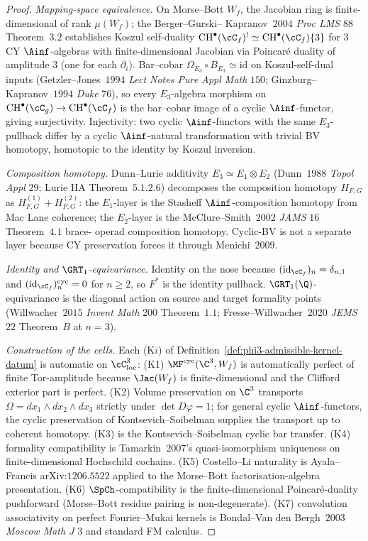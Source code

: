 \begin{proof}
\emph{Mapping-space equivalence.} On Morse--Bott $W_f$, the Jacobian
ring is finite-dimensional of rank $\mu(W_f)$; the Berger--Gurski--
Kapranov~$2004$ \textit{Proc LMS} $88$ Theorem~$3.2$ establishes
Koszul self-duality $\mathrm{CH}^\bullet(\cC_f)^! \simeq
\mathrm{CH}^\bullet(\cC_f)\{3\}$ for $3$CY $\Ainf$-algebras with
finite-dimensional Jacobian via Poincar\'e duality of amplitude $3$
(one for each $\partial_i$). Bar--cobar
$\Omega_{E_3} \circ B_{E_3} \simeq \mathrm{id}$ on Koszul-self-dual
inputs (Getzler--Jones~$1994$ \textit{Lect Notes Pure Appl Math} $150$;
Ginzburg--Kapranov~$1994$ \textit{Duke} $76$), so every $E_3$-algebra
morphism on $\mathrm{CH}^\bullet(\cC_g) \to \mathrm{CH}^\bullet(\cC_f)$
is the bar--cobar image of a cyclic $\Ainf$-functor, giving
surjectivity. Injectivity: two cyclic $\Ainf$-functors with the same
$E_3$-pullback differ by a cyclic $\Ainf$-natural transformation with
trivial BV homotopy, homotopic to the identity by Koszul inversion.

\emph{Composition homotopy.} Dunn--Lurie additivity $E_3 \simeq E_1
\otimes E_2$ (Dunn~$1988$ \textit{Topol Appl} $29$; Lurie HA
Theorem~$5.1.2.6$) decomposes the composition homotopy $H_{F, G}$ as
$H^{(1)}_{F, G} + H^{(2)}_{F, G}$: the $E_1$-layer is the Stasheff
$\Ainf$-composition homotopy from Mac Lane coherence; the $E_2$-layer
is the McClure--Smith~$2002$ \textit{JAMS} $16$ Theorem~$4.1$ brace-
operad composition homotopy. Cyclic-BV is not a separate layer because
CY preservation forces it through Menichi~$2009$.

\emph{Identity and $\GRT_1$-equivariance.} Identity on the nose
because $(\mathrm{id}_{\cC_f})_n = \delta_{n, 1}$ and
$(\mathrm{id}_{\cC_f})^{\mathrm{cyc}}_n = 0$ for $n \geq 2$, so $F^*$
is the identity pullback. $\GRT_1(\Q)$-equivariance is the diagonal
action on source and target formality points (Willwacher~$2015$
\textit{Invent Math} $200$ Theorem~$1.1$; Fresse--Willwacher~$2020$
\textit{JEMS} $22$ Theorem~$B$ at $n = 3$).

\emph{Construction of the cells.} Each \textup{(K$i$)} of
Definition~\ref{def:phi3-admissible-kernel-datum} is automatic on
$\cC_{\mathrm{loc}}^3$:
\textup{(K1)} $\MF^{\mathrm{cyc}}(\C^3, W_f)$ is automatically perfect
of finite Tor-amplitude because $\Jac(W_f)$ is finite-dimensional and
the Clifford exterior part is perfect.
\textup{(K2)} Volume preservation on $\C^3$ transports
$\Omega = dx_1 \wedge dx_2 \wedge dx_3$ strictly under $\det D\varphi
= 1$; for general cyclic $\Ainf$-functors, the cyclic preservation
of Kontsevich--Soibelman supplies the transport up to coherent
homotopy.
\textup{(K3)} is the Kontsevich--Soibelman cyclic bar transfer.
\textup{(K4)} formality compatibility is Tamarkin~$2007$'s
quasi-isomorphism uniqueness on finite-dimensional Hochschild
cochains.
\textup{(K5)} Costello--Li naturality is Ayala--Francis arXiv:$1206.5522$
applied to the Morse--Bott factorisation-algebra presentation.
\textup{(K6)} $\SpCh$-compatibility is the finite-dimensional
Poincar\'e-duality pushforward (Morse--Bott residue pairing is
non-degenerate).
\textup{(K7)} convolution associativity on perfect Fourier--Mukai
kernels is Bondal--Van den Bergh~$2003$ \textit{Moscow Math J} $3$
and standard FM calculus.
\end{proof}

